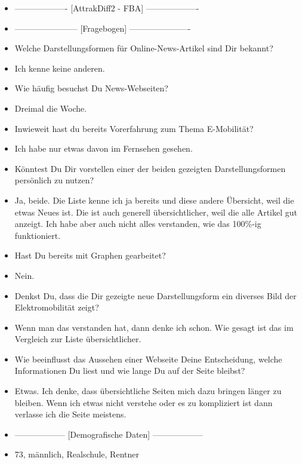 {\begin{itemize}[]
        \item {-------------------} [AttrakDiff2 - FBA] {-------------------}
        \item {-----------------------} [Fragebogen] {----------------------}
        \item {} Welche Darstellungsformen für Online-News-Artikel sind Dir bekannt?
        \item {} Ich kenne keine anderen.
        \item {} Wie häufig besuchst Du News-Webseiten?
        \item {} Dreimal die Woche.
        \item {} Inwieweit hast du bereits Vorerfahrung zum Thema E-Mobilität?
        \item {} Ich habe nur etwas davon im Fernsehen gesehen.
        \item {} Könntest Du Dir vorstellen einer der beiden gezeigten Darstellungsformen persönlich zu nutzen?
        \item {} Ja, beide. Die Liste kenne ich ja bereits und diese andere Übersicht, weil die etwas Neues ist.
              Die ist auch generell übersichtlicher, weil die alle Artikel gut anzeigt.
              Ich habe aber auch nicht alles verstanden, wie das 100\%-ig funktioniert.
        \item {} Hast Du bereits mit Graphen gearbeitet?
        \item {} Nein.
        \item {} Denkst Du, dass die Dir gezeigte neue Darstellungsform ein diverses Bild der Elektromobilität zeigt?
        \item {} Wenn man das verstanden hat, dann denke ich schon.
              Wie gesagt ist das im Vergleich zur Liste übersichtlicher.
        \item {} Wie beeinflusst das Aussehen einer Webseite Deine Entscheidung, welche Informationen Du liest und wie lange Du auf der Seite bleibst?
        \item {} Etwas. Ich denke, dass übersichtliche Seiten mich dazu bringen länger zu bleiben.
              Wenn ich etwas nicht verstehe oder es zu kompliziert ist dann verlasse ich die Seite meistens.
        \item {------------------} [Demografische Daten] {------------------}
        \item {} 73, männlich, Realschule, Rentner
    \end{itemize}}
\nolinenumbers
